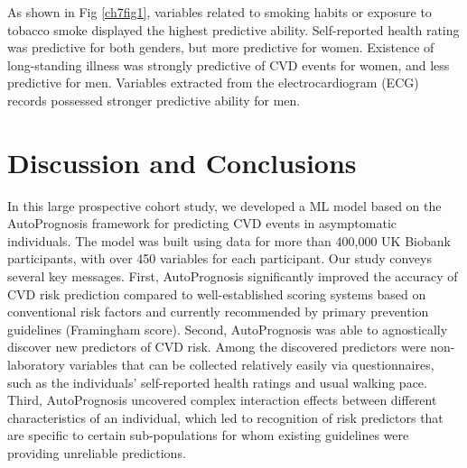 \documentclass [PhD] {uclathes}
\begin{document}
As shown in Fig \ref{ch7fig1}, variables related to smoking habits or exposure to tobacco smoke displayed the highest predictive ability. Self-reported health rating was predictive for both genders, but more predictive for women. Existence of long-standing illness was strongly predictive of CVD events for women, and less predictive for men. Variables extracted from the electrocardiogram (ECG) records possessed stronger predictive ability for men.  

\section{Discussion and Conclusions}
In this large prospective cohort study, we developed a ML model based on the AutoPrognosis framework for predicting CVD events in asymptomatic individuals. The model was built using data for more than 400,000 UK Biobank participants, with over 450 variables for each participant. Our study conveys several key messages. First, AutoPrognosis significantly improved the accuracy of CVD risk prediction compared to well-established scoring systems based on conventional risk factors and currently recommended by primary prevention guidelines (Framingham score). Second, AutoPrognosis was able to agnostically discover new predictors of CVD risk. Among the discovered predictors were non-laboratory variables that can be collected relatively easily via questionnaires, such as the individuals' self-reported health ratings and usual walking pace. Third, AutoPrognosis uncovered complex interaction effects between different characteristics of an individual, which led to recognition of risk predictors that are specific to certain sub-populations for whom existing guidelines were providing unreliable predictions. 
\end{document}
